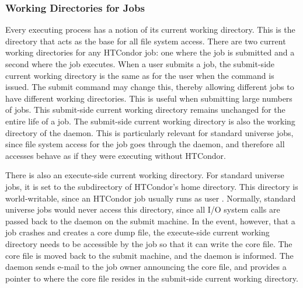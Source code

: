 \subsubsection{\label{sec:DirOfJob}Working Directories for Jobs}

Every executing process has a notion of its current working directory.
This is the directory that acts as the base for all file system
access. 
There are two current working directories for any HTCondor job:
one where the job is submitted and a
second where the job executes.
When a user submits a job,
the submit-side current working directory is
the same as for the user when the  command
is issued.
The  submit command may change this,
thereby allowing different jobs to have different working
directories.
This is useful when submitting large numbers of jobs.
This submit-side current working directory remains unchanged for the
entire life of a job. 
The submit-side current working directory is also 
the working directory of the  daemon.
This is particularly relevant for standard universe jobs,
since file system
access for the job goes through the  daemon, and
therefore all accesses behave as if they were executing without
HTCondor.

There is also an execute-side current working directory.
For standard universe jobs,
it is set to the
 subdirectory of HTCondor's home directory.
This directory is world-writable, since an HTCondor job usually runs as user
.
Normally, standard universe jobs would never access this directory,
since all I/O system calls are passed back to the
 daemon on the submit machine.
In the event, however,
that a job crashes and creates a core dump file, the execute-side
current working directory needs to be accessible by the job
so that it can write the core file.
The core file is moved back to the submit machine,
and the  daemon is informed.
The  daemon
sends e-mail to the job owner announcing the core file, and provides a
pointer to where
the core file resides in the submit-side current working directory.



%

